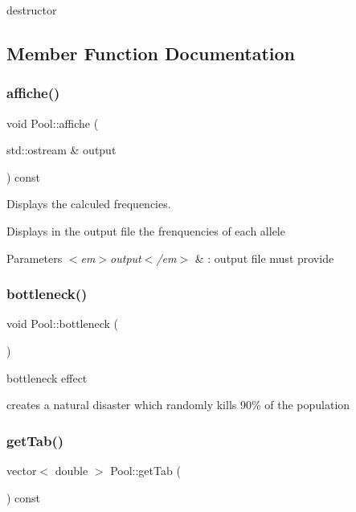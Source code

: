 destructor 



\subsection{Member Function Documentation}
\hypertarget{class_pool_ac90588d0038d9b0308a0ca22f6765b66}{}\label{class_pool_ac90588d0038d9b0308a0ca22f6765b66} 
\subsubsection{\texorpdfstring{affiche()}{affiche()}}
{\footnotesize\ttfamily void Pool\+::affiche (\begin{DoxyParamCaption}\item[{std\+::ostream \&}]{output }\end{DoxyParamCaption}) const}



Displays the calculed frequencies. 

Displays in the output file the frenquencies of each allele 
\begin{DoxyParams}{Parameters}
{\em $<$em$>$output$<$/em$>$} & \+: output file must provide \\
\hline
\end{DoxyParams}
\hypertarget{class_pool_a358feab3c6d569ee8044fa41e6da3d74}{}\label{class_pool_a358feab3c6d569ee8044fa41e6da3d74} 
\subsubsection{\texorpdfstring{bottleneck()}{bottleneck()}}
{\footnotesize\ttfamily void Pool\+::bottleneck (\begin{DoxyParamCaption}{ }\end{DoxyParamCaption})}



bottleneck effect 

creates a natural disaster which randomly kills 90\% of the population \hypertarget{class_pool_ad8b624c907ee7fccec34c124cb9613fa}{}\label{class_pool_ad8b624c907ee7fccec34c124cb9613fa} 
\subsubsection{\texorpdfstring{get\+Tab()}{getTab()}}
{\footnotesize\ttfamily vector$<$ double $>$ Pool\+::get\+Tab (\begin{DoxyParamCaption}{ }\end{DoxyParamCaption}) const}



